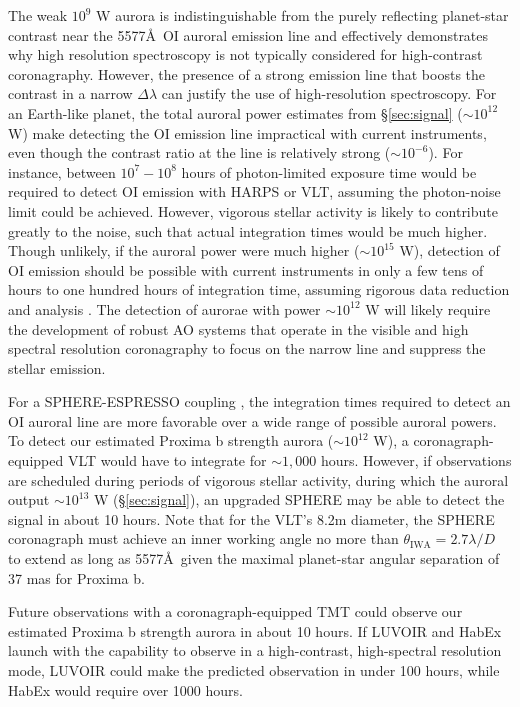 \documentclass[apjl]{emulateapj}
\begin{document}
The weak $10^{9}$ W aurora is indistinguishable from the purely reflecting planet-star contrast near the 5577\AA\ OI auroral emission line \citep{Turbet2016,Kreidberg2016,Meadows2016} and effectively demonstrates why high resolution spectroscopy is not typically considered for high-contrast coronagraphy. However, the presence of a strong emission line that boosts the contrast in a narrow $\Delta \lambda$ can justify the use of high-resolution spectroscopy. For an Earth-like planet, the total auroral power estimates from \S\ref{sec:signal} (${\sim} 10^{12}$ W) make detecting the OI emission line impractical with current instruments, even though the contrast ratio at the line is relatively strong (${\sim}10^{-6}$). For instance, between $10^7 - 10^8$ hours of photon-limited exposure time would be required to detect OI emission with HARPS or VLT, assuming the photon-noise limit could be achieved. However, vigorous stellar activity \citep{Davenport2016} is likely to contribute greatly to the noise, such that actual integration times would be much higher. Though unlikely, if the auroral power were much higher (${\sim} 10^{15}$ W), detection of OI emission should be possible with current instruments in only a few tens of hours to one hundred hours of integration time, assuming rigorous data reduction and analysis \citep[e.g.][]{Brogi2012}. The detection of aurorae with power ${\sim} 10^{12}$ W will likely require the development of robust AO systems that operate in the visible and high spectral resolution coronagraphy to focus on the narrow line and suppress the stellar emission.

For a SPHERE-ESPRESSO coupling \citep{Lovis2016}, the integration times required to detect an OI auroral line are more favorable over a wide range of possible auroral powers. To detect our estimated Proxima b strength aurora (${\sim} 10^{12}$ W), a coronagraph-equipped VLT would have to integrate for ${\sim} 1,000$ hours. However, if observations are scheduled during periods of vigorous stellar activity,
during which the auroral output ${\sim} 10^{13}$ W (\S\ref{sec:signal}), an upgraded SPHERE may be able to detect the signal in about 10 hours. Note that for the VLT's 8.2m diameter, the SPHERE coronagraph must achieve an inner working angle no more than $\theta_{\text{IWA}} = 2.7 \lambda / D$ to extend as long as 5577\AA\, given the maximal planet-star angular separation of 37 mas for Proxima b. 

Future observations with a coronagraph-equipped TMT could observe our estimated Proxima b strength aurora in about 10 hours. If LUVOIR and HabEx launch with the capability to observe in a high-contrast, high-spectral resolution mode, LUVOIR could make the predicted observation in under 100 hours, while HabEx would require over 1000 hours.
\end{document}
